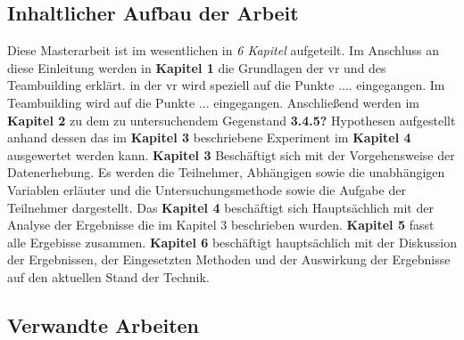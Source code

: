 \documentclass[a4paper,11pt]{article}%
\renewcommand{\\}{\vspace*{0.5\baselineskip} \newline}
\begin{document}
		\subsection{Inhaltlicher Aufbau der Arbeit}
	Diese Masterarbeit ist im wesentlichen in \textit{6 Kapitel} aufgeteilt.
	Im Anschluss an diese Einleitung werden in \textbf{Kapitel 1} die Grundlagen der \ac{vr} und des Teambuilding erklärt. in der \ac{vr} wird speziell auf die Punkte .... eingegangen.\\
	Im Teambuilding wird auf die Punkte ... eingegangen.\\
	Anschließend werden im \textbf{Kapitel 2} zu dem zu untersuchendem Gegenstand \textbf{3.4.5?} Hypothesen aufgestellt anhand dessen das im \textbf{Kapitel 3} beschriebene Experiment im \textbf{Kapitel 4} ausgewertet werden kann.\\
	\textbf{Kapitel 3} Beschäftigt sich mit der Vorgehensweise der Datenerhebung.
	Es werden die Teilnehmer, Abhängigen sowie die unabhängigen Variablen erläuter und die Untersuchungsmethode sowie die Aufgabe der Teilnehmer dargestellt.\\
	Das \textbf{Kapitel 4} beschäftigt sich Hauptsächlich mit der Analyse der Ergebnisse die im Kapitel 3 beschrieben wurden.\\
	\textbf{Kapitel 5} fasst alle Ergebisse zusammen.\\
	\textbf{Kapitel 6} beschäftigt hauptsächlich mit der Diskussion der Ergebnissen, der Eingesetzten Methoden und der Auswirkung der Ergebnisse auf den aktuellen Stand der Technik.\\
	
		\subsection{Verwandte Arbeiten}
	
	
	
	
\end{document}
